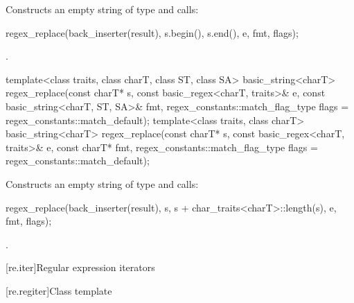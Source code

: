 \begin{itemdescr}
\pnum
\effects
Constructs an empty string  of
type  and calls:
\begin{codeblock}
regex_replace(back_inserter(result), s.begin(), s.end(), e, fmt, flags);
\end{codeblock}

\pnum
\returns
{}.
\end{itemdescr}

%
\begin{itemdecl}
template<class traits, class charT, class ST, class SA>
  basic_string<charT>
    regex_replace(const charT* s,
                  const basic_regex<charT, traits>& e,
                  const basic_string<charT, ST, SA>& fmt,
                  regex_constants::match_flag_type flags = regex_constants::match_default);
template<class traits, class charT>
  basic_string<charT>
    regex_replace(const charT* s,
                  const basic_regex<charT, traits>& e,
                  const charT* fmt,
                  regex_constants::match_flag_type flags = regex_constants::match_default);
\end{itemdecl}

\begin{itemdescr}
\pnum
\effects
Constructs an empty string  of
type  and calls:
\begin{codeblock}
regex_replace(back_inserter(result), s, s + char_traits<charT>::length(s), e, fmt, flags);
\end{codeblock}

\pnum
\returns
{}.
\end{itemdescr}

[re.iter]{Regular expression iterators}

[re.regiter]{Class template }

